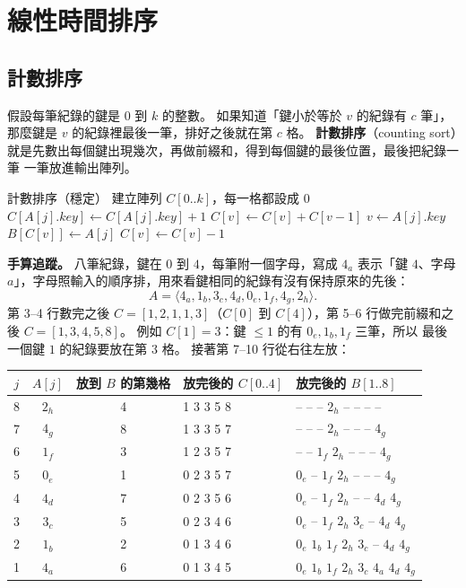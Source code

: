 \section{線性時間排序}
\label{sec:lin-linear}

\subsection{計數排序}
\label{sec:lin-counting}

假設每筆紀錄的鍵是 $0$ 到 $k$ 的整數。 如果知道「鍵小於等於 $v$ 的紀錄有 $c$ 筆」，
那麼鍵是 $v$ 的紀錄裡最後一筆，排好之後就在第 $c$ 格。 \textbf{計數排序}（counting
sort）就是先數出每個鍵出現幾次，再做前綴和，得到每個鍵的最後位置，最後把紀錄一筆
一筆放進輸出陣列。

\begin{pseudo}[label=alg:lin-counting]{計數排序（穩定）}
    \State 建立陣列 $C[0..k]$，每一格都設成 $0$
        \State $C[A[j].\mathit{key}] \gets C[A[j].\mathit{key}] + 1$
    \EndFor
        \State $C[v] \gets C[v] + C[v - 1]$ 
    \EndFor
        \State $v \gets A[j].\mathit{key}$
        \State $B[C[v]] \gets A[j]$
        \State $C[v] \gets C[v] - 1$
    \EndFor
\EndProcedure
\end{pseudo}

\textbf{手算追蹤。} 八筆紀錄，鍵在 $0$ 到 $4$，每筆附一個字母，寫成 $4_a$ 表示「鍵
$4$、字母 $a$」，字母照輸入的順序排，用來看鍵相同的紀錄有沒有保持原來的先後：
\[
A = \langle 4_a, 1_b, 3_c, 4_d, 0_e, 1_f, 4_g, 2_h \rangle .
\]
第 3--4 行數完之後 $C = [1, 2, 1, 1, 3]$（$C[0]$ 到 $C[4]$），第 5--6 行做完前綴和之
後 $C = [1, 3, 4, 5, 8]$。 例如 $C[1] = 3$：鍵 $\le 1$ 的有 $0_e, 1_b, 1_f$ 三筆，所以
最後一個鍵 $1$ 的紀錄要放在第 $3$ 格。 接著第 7--10 行從右往左放：

\begin{center}
\begin{tabular}{cccl l}
\toprule
$j$ & $A[j]$ & 放到 $B$ 的第幾格 & 放完後的 $C[0..4]$ & 放完後的 $B[1..8]$ \\
\midrule
8 & $2_h$ & 4 & 1 3 3 5 8 & -- -- -- $2_h$ -- -- -- -- \\
7 & $4_g$ & 8 & 1 3 3 5 7 & -- -- -- $2_h$ -- -- -- $4_g$ \\
6 & $1_f$ & 3 & 1 2 3 5 7 & -- -- $1_f$ $2_h$ -- -- -- $4_g$ \\
5 & $0_e$ & 1 & 0 2 3 5 7 & $0_e$ -- $1_f$ $2_h$ -- -- -- $4_g$ \\
4 & $4_d$ & 7 & 0 2 3 5 6 & $0_e$ -- $1_f$ $2_h$ -- -- $4_d$ $4_g$ \\
3 & $3_c$ & 5 & 0 2 3 4 6 & $0_e$ -- $1_f$ $2_h$ $3_c$ -- $4_d$ $4_g$ \\
2 & $1_b$ & 2 & 0 1 3 4 6 & $0_e$ $1_b$ $1_f$ $2_h$ $3_c$ -- $4_d$ $4_g$ \\
1 & $4_a$ & 6 & 0 1 3 4 5 & $0_e$ $1_b$ $1_f$ $2_h$ $3_c$ $4_a$ $4_d$ $4_g$ \\
\bottomrule
\end{tabular}
\end{center}

